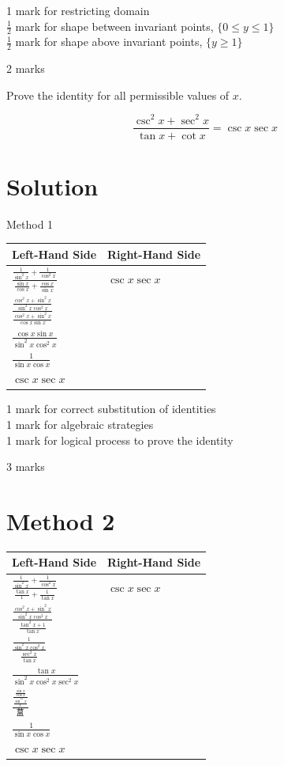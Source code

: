 \documentclass[10pt]{article}
\begin{document}
1 mark for restricting domain\\
$\frac{1}{2}$ mark for shape between invariant points, $\{0 \leq y \leq 1\}$\\
$\frac{1}{2}$ mark for shape above invariant points, $\{y \geq 1\}$

2 marks

Prove the identity for all permissible values of $x$.

$$
\frac{\csc ^{2} x+\sec ^{2} x}{\tan x+\cot x}=\csc x \sec x
$$

\section*{Solution}
Method 1

\begin{center}
\begin{tabular}{|l|l|}
\hline
Left-Hand Side & Right-Hand Side \\
\hline
$\frac{\frac{1}{\sin ^{2} x}+\frac{1}{\cos ^{2} x}}{\frac{\sin x}{\cos x}+\frac{\cos x}{\sin x}}$ & $\csc x \sec x$ \\
\hline
$\frac{\frac{\cos ^{2} x+\sin ^{2} x}{\sin ^{2} x \cos ^{2} x}}{\frac{\cos ^{2} x+\sin ^{2} x}{\cos x \sin x}}$ &  \\
\hline
$\frac{\cos x \sin x}{\sin ^{2} x \cos ^{2} x}$ &  \\
\hline
$\frac{1}{\sin x \cos x}$ &  \\
\hline
$\csc x \sec x$ &  \\
\hline
\end{tabular}
\end{center}

1 mark for correct substitution of identities\\
1 mark for algebraic strategies\\
1 mark for logical process to prove the identity

3 marks

\section*{Method 2}
\begin{center}
\begin{tabular}{|l|l|}
\hline
Left-Hand Side & Right-Hand Side \\
\hline
$\frac{\frac{1}{\sin ^{2} x}+\frac{1}{\cos ^{2} x}}{\frac{\tan x}{1}+\frac{1}{\tan x}}$ & $\csc x \sec x$ \\
\hline
$\frac{\frac{\cos ^{2} x+\sin ^{2} x}{\sin ^{2} x \cos ^{2} x}}{\frac{\tan ^{2} x+1}{\tan x}}$ &  \\
\hline
$\frac{\frac{1}{\sin ^{2} x \cos ^{2} x}}{\frac{\sec ^{2} x}{\tan x}}$ &  \\
\hline
$\frac{\tan x}{\sin ^{2} x \cos ^{2} x \sec ^{2} x}$ &  \\
\hline
$\frac{\frac{\frac{\sin x}{\cos x}}{\frac{\sin ^{12} x}{1}}}{\text { 蒀 }}$ &  \\
\hline
$\frac{1}{\sin x \cos x}$ &  \\
\hline
$\csc x \sec x$ &  \\
\hline
\end{tabular}
\end{center}
\end{document}
